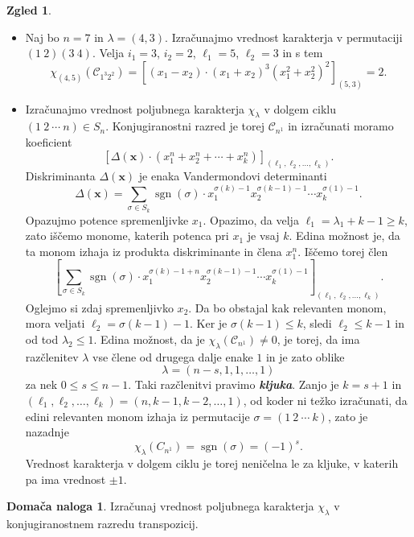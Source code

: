 \documentclass[11pt]{book}
\def\conclass{\mathcal{C}}
\DeclareMathOperator\sgn{sgn}
\def\definicija{\color{rdeca}\bf\em}
\theoremstyle{definition}
\theoremstyle{zgled}
\newtheorem*{zgled}{Zgled}
\theoremstyle{odprtproblem}
\theoremstyle{domacanaloga}
\newtheorem*{domacanaloga}{Domača naloga}
\theoremstyle{izrek}
\begin{document}
\begin{zgled} \leavevmode
\begin{itemize}
\item Naj bo $n = 7$ in $\lambda = (4,3)$. Izračunajmo vrednost karakterja v permutaciji $(1 \ 2)(3 \ 4)$. Velja $i_1 = 3$, $i_2 = 2$, $\ell_1 = 5$, $\ell_2 = 3$ in s tem
\[
    \chi_{(4,5)}(\conclass_{1^3 2^2}) = 
    \left[ (x_1 - x_2) \cdot (x_1 + x_2)^3 (x_1^2 + x_2^2)^2 \right]_{(5,3)} =
    2.
\]

\item Izračunajmo vrednost poljubnega karakterja $\chi_{\lambda}$ v dolgem ciklu $(1 \ 2 \ \cdots \ n) \in S_n$. Konjugiranostni razred je torej $\conclass_{n^1}$ in izračunati moramo koeficient
\[
    \left[ \Delta(\mathbf{x}) \cdot (x_1^n + x_2^n + \cdots + x_k^n) \right]_{(\ell_1, \ell_2, \dots, \ell_k)}.
\]
Diskriminanta $\Delta(\mathbf{x})$ je enaka Vandermondovi determinanti
\[
    \Delta(\mathbf{x}) = \sum_{\sigma \in S_k} \sgn(\sigma) \cdot x_1^{\sigma(k) - 1} x_2^{\sigma(k-1) - 1} \cdots x_k^{\sigma(1) - 1}.
\]
Opazujmo potence spremenljivke $x_1$. Opazimo, da velja $\ell_1 = \lambda_1 + k - 1 \geq k$, zato iščemo monome, katerih potenca pri $x_1$ je vsaj $k$. Edina možnost je, da ta monom izhaja iz produkta diskriminante in člena $x_1^n$. Iščemo torej člen
\[
    \left[ \sum_{\sigma \in S_k} \sgn(\sigma) \cdot x_1^{\sigma(k) - 1 + n} x_2^{\sigma(k-1) - 1} \cdots x_k^{\sigma(1) - 1} \right]_{(\ell_1, \ell_2, \dots, \ell_k)}.
\]
Oglejmo si zdaj spremenljivko $x_2$. Da bo obstajal kak relevanten monom, mora veljati $\ell_2 = \sigma(k-1) - 1$. Ker je $\sigma(k-1) \leq k$, sledi $\ell_2 \leq k -1$ in od tod $\lambda_2 \leq 1$. Edina možnost, da je $\chi_{\lambda}(\conclass_{n^1}) \neq 0$, je torej, da ima razčlenitev $\lambda$ vse člene od drugega dalje enake $1$ in je zato oblike
\[
    \lambda = (n-s, 1, 1, \dots, 1)
\]
za nek $0 \leq s \leq n-1$. Taki razčlenitvi pravimo {\definicija kljuka}. Zanjo je $k = s+1$ in $(\ell_1, \ell_2, \dots, \ell_k) = (n, k-1, k-2, \dots, 1)$, od koder ni težko izračunati, da edini relevanten monom izhaja iz permutacije $\sigma = (1 \ 2 \ \cdots \ k)$, zato je nazadnje
\[
    \chi_{\lambda}(C_{n^1}) = \sgn(\sigma) = (-1)^s.
\]
Vrednost karakterja v dolgem ciklu je torej neničelna le za kljuke, v katerih pa ima vrednost $\pm 1$.
\end{itemize}
\end{zgled}

\begin{domacanaloga}
    Izračunaj vrednost poljubnega karakterja $\chi_{\lambda}$ v konjugiranostnem razredu transpozicij.
\end{domacanaloga}
\end{document}

